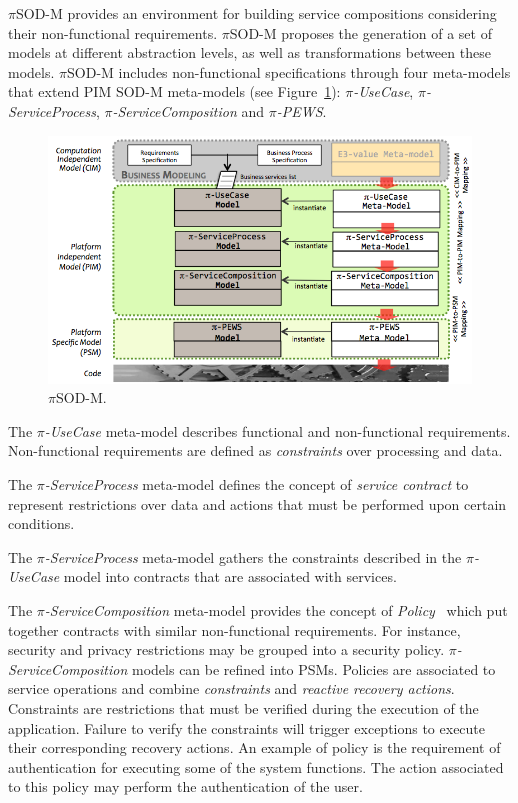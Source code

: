 $\pi$SOD-M provides an environment for building service compositions considering
their non-functional requirements. $\pi$SOD-M proposes the generation of a set of models at different abstraction levels, as well as transformations between these models.
$\pi$SOD-M includes non-functional specifications through
 four meta-models that extend PIM SOD-M meta-models (see Figure~\ref{fig:piSOD-M}): \textit{$\pi$-UseCase}, \textit{$\pi$-ServiceProcess}, \textit{$\pi$-ServiceCom\-po\-si\-tion} and \textit{$\pi$-PEWS}.


\begin{figure}[h]
\centering
\includegraphics[width=1.0\textwidth]{figs/piSODM}
\caption{$\pi$SOD-M.}
\label{fig:piSOD-M}
\end{figure}


The \textit{$\pi$-UseCase} meta-model describes functional and non-functional requirements.
Non-functional requirements are defined as \textit{constraints} over processing and data. 

The \textit{$\pi$-ServiceProcess} meta-model defines the concept of \textit{service contract} to represent restrictions over data and actions that must be performed upon certain conditions. 

The \textit{$\pi$-ServiceProcess} meta-model gathers the constraints
described in the \textit{$\pi$-UseCase} model into contracts that are associated
with services. 

The \textit{$\pi$-ServiceComposition} meta-model provides the concept of \textit{Policy}~\cite{Espinosa-Oviedo2011a}
which put together contracts with similar non-functional requirements. 
For instance, security and privacy restrictions may be grouped into a security policy.
\textit{$\pi$-ServiceComposition} models can be refined into PSMs. Policies are associated to service operations and combine \textit{constraints} and \textit{reactive recovery actions}.
Constraints are restrictions that must be verified during the execution of the application. 
Failure to verify the constraints will trigger exceptions to execute their corresponding recovery actions.
An example of policy is the requirement of authentication for executing some of the system functions. 
The action associated to this policy may perform the authentication of the user.

